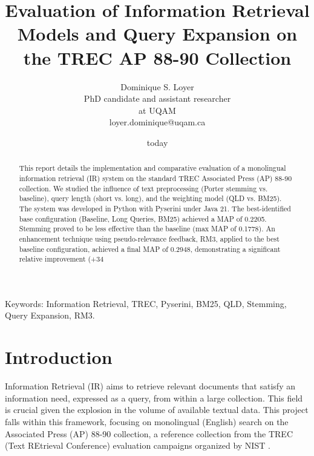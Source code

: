 \documentclass[11pt,a4paper]{article}
\title{Evaluation of Information Retrieval Models and Query Expansion on the TREC AP 88-90 Collection} %
\author{Dominique S. Loyer\\
  PhD candidate and assistant researcher \\
  at UQAM \\
  loyer.dominique@uqam.ca \\}
\date{today}
\begin{document}
\maketitle

\begin{abstract}
This report details the implementation and comparative evaluation of a monolingual information retrieval (IR) system on the standard TREC Associated Press (AP) 88-90 collection. We studied the influence of text preprocessing (Porter stemming vs. baseline), query length (short vs. long), and the weighting model (QLD vs. BM25). The system was developed in Python with Pyserini under Java 21. The best-identified base configuration (Baseline, Long Queries, BM25) achieved a MAP of 0.2205. Stemming proved to be less effective than the baseline (max MAP of 0.1778). An enhancement technique using pseudo-relevance feedback, RM3, applied to the best baseline configuration, achieved a final MAP of 0.2948, demonstrating a significant relative improvement (+34%
\end{abstract}

Keywords: Information Retrieval, TREC, Pyserini, BM25, QLD, Stemming, Query Expansion, RM3.

\section{Introduction}
Information Retrieval (IR) aims to retrieve relevant documents that satisfy an information need, expressed as a query, from within a large collection. This field is crucial given the explosion in the volume of available textual data. This project falls within this framework, focusing on monolingual (English) search on the Associated Press (AP) 88-90 collection, a reference collection from the TREC (Text REtrieval Conference) evaluation campaigns organized by NIST \citep{Donna1994Overview}. %
\end{document}
